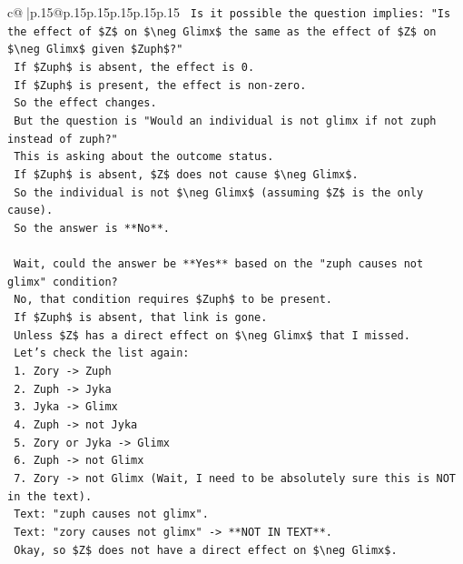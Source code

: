 \documentclass{article}
\begin{document}
{\begin{supertabular}{c@{$\;$}|p{.15\linewidth}@{}p{.15\linewidth}p{.15\linewidth}p{.15\linewidth}p{.15\linewidth}p{.15\linewidth}}
{{{\texttt{    Is it possible the question implies: "Is the effect of \$Z\$ on \$\textbackslash{}neg Glimx\$ the same as the effect of \$Z\$ on \$\textbackslash{}neg Glimx\$ given \$Zuph\$?"} \\
\texttt{    If \$Zuph\$ is absent, the effect is 0.} \\
\texttt{    If \$Zuph\$ is present, the effect is non{-}zero.} \\
\texttt{    So the effect changes.} \\
\texttt{    But the question is "Would an individual is not glimx if not zuph instead of zuph?"} \\
\texttt{    This is asking about the outcome status.} \\
\texttt{    If \$Zuph\$ is absent, \$Z\$ does not cause \$\textbackslash{}neg Glimx\$.} \\
\texttt{    So the individual is not \$\textbackslash{}neg Glimx\$ (assuming \$Z\$ is the only cause).} \\
\texttt{    So the answer is **No**.} \\
\\ 
\texttt{    Wait, could the answer be **Yes** based on the "zuph causes not glimx" condition?} \\
\texttt{    No, that condition requires \$Zuph\$ to be present.} \\
\texttt{    If \$Zuph\$ is absent, that link is gone.} \\
\texttt{    Unless \$Z\$ has a direct effect on \$\textbackslash{}neg Glimx\$ that I missed.} \\
\texttt{    Let's check the list again:} \\
\texttt{    1. Zory {-}> Zuph} \\
\texttt{    2. Zuph {-}> Jyka} \\
\texttt{    3. Jyka {-}> Glimx} \\
\texttt{    4. Zuph {-}> not Jyka} \\
\texttt{    5. Zory or Jyka {-}> Glimx} \\
\texttt{    6. Zuph {-}> not Glimx} \\
\texttt{    7. Zory {-}> not Glimx (Wait, I need to be absolutely sure this is NOT in the text).} \\
\texttt{    Text: "zuph causes not glimx".} \\
\texttt{    Text: "zory causes not glimx" {-}> **NOT IN TEXT**.} \\
\texttt{    Okay, so \$Z\$ does not have a direct effect on \$\textbackslash{}neg Glimx\$.} \\
}}}
\end{supertabular}}
\end{document}
